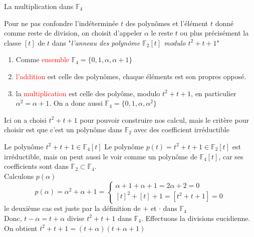 
\begin{parag}{La multiplication dans $\mathbb{F}_4$}
    
        Pour ne pas confondre l'indéterminée $t$ des polynômes et l'élément $t$ donné comme reste de division, on choisit d'appeler $\alpha$ le reste $t$ ou plus précisément la classe $[t]$ de $t$ dans "\textit{l'anneau des polynôme $\mathbb{F}_2[t]$ modulo $t^2 + t + 1$}"
        \begin{enumerate}
            \item Comme \textcolor{red}{ensemble} $\mathbb{F}_4 = \{0, 1, \alpha, \alpha + 1\}$
            \item \textcolor{red}{l'addition} est celle des polynômes, chaque éléments est son propres opposé.
            \item la \textcolor{red}{multiplication} est celle des polyôme, modulo $t^2 + t + 1$, en particulier $\alpha^2 = \alpha + 1$. On a donc aussi $\mathbb{F}_4 = \{0, 1, \alpha, \alpha^2\}$   
        \end{enumerate}
        \begin{framedremark}
            Ici on a choisi $t^2 + t + 1$ pour pouvoir construire nos calcul, mais le critère pour choisir est que c'est un polynôme dans $\mathbb{F}_2$ avec des coefficient irréductible
        \end{framedremark}
        \begin{subparag}{Le polynôme $t^2 + t + 1 \in \mathbb{F}_4[t]$}
            Le polynôme $p(t) = t^2 + t + 1 \in \mathbb{F}_2[t]$ est irréductible, mais on peut aussi le voir comme un polynôme de $\mathbb{F}_4[t]$, car ses coefficients sont dans $\mathbb{F}_2 \subset \mathbb{F}_4$.
            \\
            Calculons $p(\alpha)$
            \[p(\alpha) = \alpha^2 + \alpha + 1 = \begin{cases}
                \alpha + 1  + \alpha + 1 = 2\alpha + 2  = 0\\
                [t]^2 + [t] + 1  = [t^2 + t + 1] = 0
            \end{cases}\]
            le deuxième cas est juste par la définition de $+$ et $\cdot $ dans $\mathbb{F}_4$\\
            Donc, $t-\alpha = t + \alpha$ divise $t^2 + t + 1$ dans $\mathbb{F}_4$. Effectuons la divisions eucidienne. On obtient $t^2 + t + 1 = (t+\alpha)(t + \alpha + 1)$
        \end{subparag}
        \end{parag}

